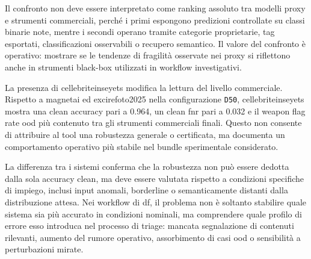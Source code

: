 Il confronto non deve essere interpretato come ranking assoluto tra modelli proxy
e strumenti commerciali, perché i primi espongono predizioni controllate su classi
binarie note, mentre i secondi operano tramite categorie proprietarie, tag
esportati, classificazioni osservabili o recupero semantico. Il valore del
confronto è operativo: mostrare se le tendenze di fragilità osservate nei proxy si
riflettono anche in strumenti black-box utilizzati in workflow investigativi.

La presenza di \gls{cellebriteinseyets} modifica la lettura del livello
commerciale. Rispetto a \gls{magnetai} ed \gls{excirefoto2025} nella
configurazione \texttt{D50}, \gls{cellebriteinseyets} mostra una clean accuracy
pari a 0.964, un clean \gls{fnr} pari a 0.032 e il weapon flag rate \gls{ood} più
contenuto tra gli strumenti commerciali finali. Questo non consente di attribuire
al tool una robustezza generale o certificata, ma documenta un comportamento
operativo più stabile nel bundle sperimentale considerato.

La differenza tra i sistemi conferma che la robustezza non può essere dedotta
dalla sola accuracy clean, ma deve essere valutata rispetto a condizioni
specifiche di impiego, inclusi input anomali, borderline o semanticamente
distanti dalla distribuzione attesa. Nei workflow di \gls{df}, il problema non è
soltanto stabilire quale sistema sia più accurato in condizioni nominali, ma
comprendere quale profilo di errore esso introduca nel processo di triage:
mancata segnalazione di contenuti rilevanti, aumento del rumore operativo,
assorbimento di casi \gls{ood} o sensibilità a perturbazioni mirate.
